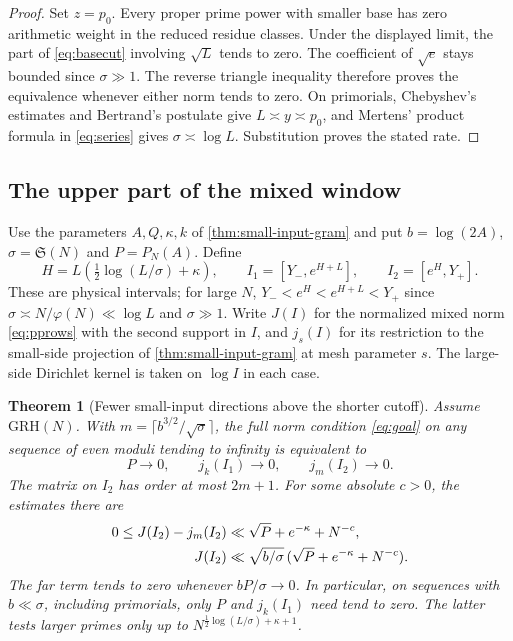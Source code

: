 \documentclass[11pt,a4paper]{article}
\numberwithin{equation}{section}
\newtheorem{theorem}{Theorem}[section]
\newcommand{\SSS}{\mathfrak S}
\newcommand{\grh}{\mathrm{GRH}}
\begin{document}
\begin{proof}
Set $z=p_0$. Every proper prime power with smaller base has
zero arithmetic weight in the reduced residue classes. Under the
displayed limit, the part of \cref{eq:basecut} involving $\sqrt L$
tends to zero. The coefficient of $\sqrt e$ stays bounded since
$\sigma\gg1$. The reverse triangle inequality therefore proves the
equivalence whenever either norm tends to zero. On primorials,
Chebyshev's estimates and Bertrand's postulate give
$L\asymp y\asymp p_0$, and Mertens' product formula in
\cref{eq:series} gives $\sigma\asymp\log L$. Substitution proves
the stated rate.
\end{proof}

\subsection{The upper part of the mixed window}

Use the parameters $A,Q,\kappa,k$ of \cref{thm:small-input-gram}
and put $b=\log(2A)$, $\sigma=\SSS(N)$ and $P=P_N(A)$. Define
\[
 H=L\left(\tfrac12\log(L/\sigma)+\kappa\right),\qquad
 I_1=[Y_-,e^{H+L}],\qquad I_2=[e^H,Y_+].
\]
These are physical intervals; for large $N$, $Y_-<e^H<e^{H+L}<Y_+$
since $\sigma\asymp N/\varphi(N)\ll\log L$ and $\sigma\gg1$.
Write $J(I)$ for the normalized mixed norm \eqref{eq:pprows}
with the second support in $I$, and $j_s(I)$ for its restriction
to the small-side projection of \cref{thm:small-input-gram}
at mesh parameter $s$. The large-side Dirichlet kernel is taken
on $\log I$ in each case.

\begin{theorem}[Fewer small-input directions above the shorter cutoff]
\label{thm:mixed-far}
Assume $\grh(N)$. With $m=\lceil b^{3/2}/\sqrt{\sigma}\rceil$,
the full norm condition \eqref{eq:goal} on any sequence of even
moduli tending to infinity is equivalent to
\[
 P\longrightarrow0,\qquad j_k(I_1)\longrightarrow0,\qquad
 j_m(I_2)\longrightarrow0 .
\]
The matrix on $I_2$ has order at most $2m+1$. For some absolute
$c>0$, the estimates there are
\begin{align}
 0\le J(I_2)-j_m(I_2)&\ll \sqrt P+e^{-\kappa}+N^{-c},\notag\\
 J(I_2)&\ll
 \sqrt{b/\sigma}\,(\sqrt P+e^{-\kappa}+N^{-c}).
 \label{eq:mixed-far}
\end{align}
The far term tends to zero whenever $bP/\sigma\to0$. In particular,
on sequences with $b\ll\sigma$, including primorials, only $P$ and
$j_k(I_1)$ need tend to zero. The latter tests larger primes only
up to $N^{\frac12\log(L/\sigma)+\kappa+1}$.
\end{theorem}
\end{document}
